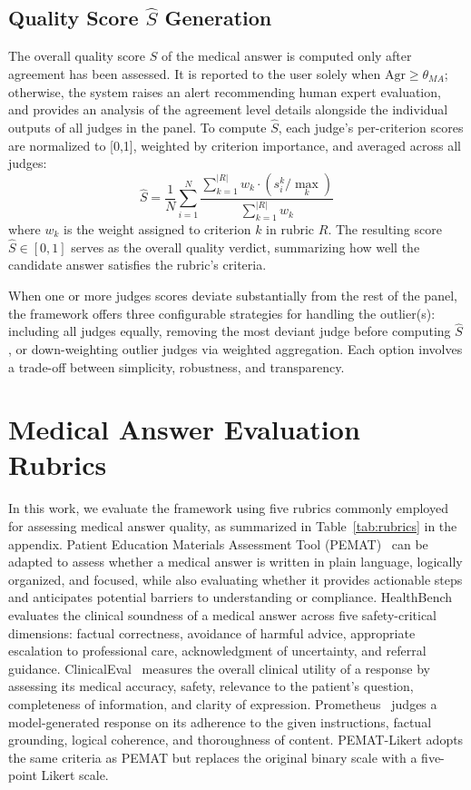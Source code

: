 \documentclass[11pt]{article}
\begin{document}
\subsection{Quality Score $\hat{S}$ Generation}
The overall quality score $\hat{S}$ of the medical answer is computed only after agreement has been assessed. It is reported to the user solely when $\mathrm{Agr} \geq \theta_{MA}$; otherwise, the system raises an alert recommending human expert evaluation, and provides an analysis of the agreement level details alongside the individual outputs of all judges in the panel. To compute 
$\hat{S}$, each judge's per-criterion scores are normalized to
[0,1], weighted by criterion importance, and averaged across all judges:
\begin{equation}
\hat{S} = \frac{1}{N}\sum_{i=1}^{N}
\frac{\sum_{k=1}^{|R|} w_k \cdot (s_i^k / \max_k)}{\sum_{k=1}^{|R|} w_k}
\label{eq:score}
\end{equation}
\noindent where $w_k$ is the weight assigned to criterion $k$ in rubric $R$. The resulting score $\hat{S} \in [0,1]$ serves as the overall quality verdict, summarizing how well the candidate answer satisfies the rubric's criteria. 

When one or more judges scores deviate substantially from the rest of the panel, the framework offers three configurable strategies for handling the outlier(s): including all judges equally, removing the most deviant judge before computing $\hat{S}$, or down-weighting outlier judges via weighted aggregation. Each option involves a trade-off between simplicity, robustness, and transparency.

\section{Medical Answer Evaluation Rubrics}

In this work, we evaluate the framework using five rubrics commonly employed for assessing medical answer quality, as summarized in Table~\ref{tab:rubrics} in the appendix. Patient Education Materials Assessment Tool (PEMAT)~\cite{shoemaker2014development} can be adapted to assess whether a medical answer is written in plain language, logically organized, and focused, while also evaluating whether it provides actionable steps and anticipates potential barriers to understanding or compliance. HealthBench~\cite{arora2025healthbench} evaluates the clinical soundness of a medical answer across five safety-critical dimensions: factual correctness, avoidance of harmful advice, appropriate escalation to professional care, acknowledgment of uncertainty, and referral guidance.
ClinicalEval~\cite{ho2024qualitative} measures the overall clinical utility of a response by assessing its medical accuracy, safety, relevance to the patient's question, completeness of information, and clarity of expression.
Prometheus~\cite{kim2024prometheus} judges a model-generated response on its adherence to the given instructions, factual grounding, logical coherence, and thoroughness of content. PEMAT-Likert adopts the same criteria as PEMAT but replaces the original binary scale with a five-point Likert scale.
\end{document}
